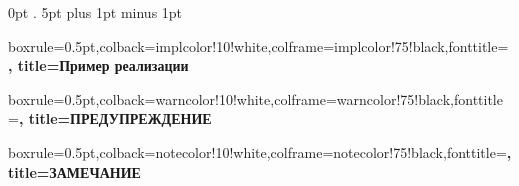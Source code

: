     {\topsep}   %
    {\topsep}   %
    {\itshape}  %
    {0pt}       %
    {\bfseries} %
    {.}         %
    {5pt plus 1pt minus 1pt} %
    {}          %

\theoremstyle{thstyle}

\newtheorem{define}{Определение}[section]
\newtheorem{example}{Пример}[section]


\newenvironment{fig}
{
    \begin{figure}[H]
    \centering
}
{
    \end{figure}
}

\newenvironment{colbox}[1]{%
   \def\FrameCommand{\colorbox{#1}}%
   \MakeFramed{\advance\hsize-\width \FrameRestore}}
 {\endMakeFramed}



{%
    boxrule=0.5pt,colback=implcolor!10!white,colframe=implcolor!75!black,fonttitle=\bfseries,
    title=Пример реализации~\thetcbcounter%
}


{%
    boxrule=0.5pt,colback=warncolor!10!white,colframe=warncolor!75!black,fonttitle=\bfseries,
    title=ПРЕДУПРЕЖДЕНИЕ~\thetcbcounter%
}



{%
    boxrule=0.5pt,colback=notecolor!10!white,colframe=notecolor!75!black,fonttitle=\bfseries,
    title=ЗАМЕЧАНИЕ~\thetcbcounter%
}
